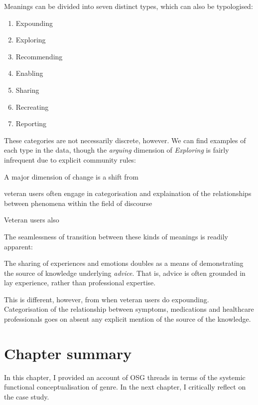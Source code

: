 Meanings can be divided into seven distinct types, which can also be typologised:

\begin{enumerate}
    \item Expounding
    \item Exploring
    \item Recommending
    \item Enabling
    \item Sharing
    \item Recreating
    \item Reporting
\end{enumerate}
%
These categories are not necessarily discrete, however. 
%
We can find examples of each type in the data, though the \emph{arguing} dimension of \emph{Exploring} is fairly infrequent due to explicit community rules: 

A major dimension of change is a shift from 

veteran users often engage in categorisation and explaination of the relationships between phenomena within the field of discourse

Veteran users also 

The seamlessness of transition between these kinds of meanings is readily apparent:

%
The sharing of experiences and emotions doubles as a means of demonstrating the source of knowledge underlying \emph{advice}. That is, advice is often grounded in lay experience, rather than professional expertise.

This is different, however, from when veteran users do expounding. Categorisation of the relationship between symptoms, medications and healthcare professionals goes on absent any explicit mention of the source of the knowledge.



\section{Chapter summary}

In this chapter, I provided an account of OSG threads in terms of the systemic functional conceptualisation of genre. In the next chapter, I critically reflect on the case study.

